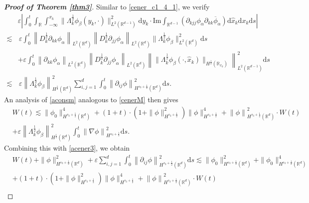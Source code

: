 \documentclass[10pt,twoside,a4paper]{article}
\numberwithin{equation}{section}\allowdisplaybreaks
\begin{document}
\begin{proof}[\textbf{Proof of Theorem \ref{thm3}}]
	Similar to \eqref{cener_c1_4_1}, we verify
	\begin{align*}
		&\varepsilon \left| \int_0^t	\int_{\mathbb{R}}\int_{-\infty}^{x_k} \|\Lambda_k^{\frac 12}\phi_{\beta}(y_k,\cdot)\|^2_{L^2(\mathbb{R}^{d-1})} \mathrm{d} y_k   \cdot\mathrm{Im}\int_{\mathbb{R}^{d-1}} \left(\partial_{kjj}\phi_{\alpha } \partial_{kk}\overline{\phi}_\alpha\right) \mathrm{d} \hat{x}_k\mathrm{d} x_k\mathrm{d} s\right|\\
		\lesssim &\,\varepsilon \int_0^t \left\|   D_k^{\frac 12}  \partial_{kk}\phi_\alpha\right\|_{L^2(\mathbb{R}^d)}  \left\|   D_k^{\frac 12} \partial_{jj}\phi_\alpha\right\|_{L^2(\mathbb{R}^d)} \|\Lambda_k^{\frac 12}\phi_{\beta}\|_{L^{2}(\mathbb{R}^d)}^2 \mathrm{d} s\nonumber\\
		&+\varepsilon\int_0^t \left\|    \partial_{kk}\phi_{\alpha}\right\|_{L^2(\mathbb{R}^d)}   \left\|   D_k^{\frac 12} \partial_{jj}\phi_\alpha\right\|_{L^2(\mathbb{R}^d)} \left\| \|\Lambda_k^{\frac 12}\phi_{\beta}(\cdot,\hat{x}_k)\|_{H^{\frac12}(\mathbb{R}_{x_k})} \right\|_{L^{2}(\mathbb{R}^{d-1})}^2 \mathrm{d} s\nonumber\\
		\lesssim &\,\varepsilon \left\| \Lambda_k^{\frac 12}\phi_{\beta}\right\|_{H^{\frac12}(\mathbb{R}^d)}^2  \sum_{i,j=1}^d\int_0^t\left\| \partial_{ij}\phi\right\|_{H^{s_3+\frac 12}(\mathbb{R}^d)}^2 \mathrm{d} s.
	\end{align*}
An analysis of \eqref{aconsm} analogous to \eqref{cenerM} then gives
	\begin{align*}
		&W(t) \lesssim   \|\phi_0\|^4_{H^{s_3+\frac 12}(\mathbb{R}^{d})} +  (1+t)\cdot\left(1+\|\phi\|_{H^{s_3+\frac 12}}^2\right)\|\phi\|_{H^{s_3+\frac 12}}^4+\left\|  \phi\right\|_{H^{s_3+\frac 12}(\mathbb{R}^d)}^2 \cdot W (t)\\
		&+\varepsilon \left\| \Lambda_k^{\frac 12}\phi_{\beta}\right\|_{H^{\frac12}(\mathbb{R}^d)}^2\int_0^t\left\| \nabla\phi\right\|_{H^{s_3+\frac 12}}^2 \mathrm{d} s. \nonumber
	\end{align*}
Combining this with \eqref{acener3}, we obtain
	\begin{align*}
		&W(t) +\|\phi\|_{H^{s_3+\frac12}(\mathbb{R}^{d})}^2+\varepsilon  \sum_{i,j=1}^d\int_0^t\left\| \partial_{ij}\phi\right\|_{H^{s_3+\frac 12}(\mathbb{R}^d)}^2 \mathrm{d} s\lesssim  \|\phi_0\|_{H^{s_3+\frac12}(\mathbb{R}^{d})}^2+\|\phi_0\|_{H^{s_3+\frac12}(\mathbb{R}^{d})}^4\nonumber\\
		&+(1+t)\cdot\left(1+\|\phi\|_{H^{s_3+\frac 12}}^2\right)\|\phi\|_{H^{s_3+\frac 12}}^4+\left\|  \phi\right\|_{H^{s_3+\frac 12}(\mathbb{R}^d)}^2 \cdot W (t)\nonumber\\

\end{align*}
\end{proof}
\end{document}
